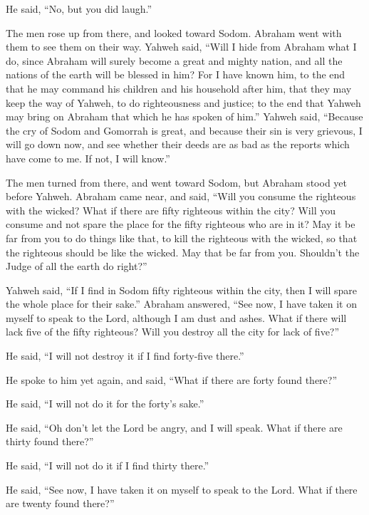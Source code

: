 He said, ``No, but you did laugh.''

 The men rose up from there, and looked toward Sodom.
Abraham went with them to see them on their way.  Yahweh
said, ``Will I hide from Abraham what I do,  since
Abraham will surely become a great and mighty nation, and all the
nations of the earth will be blessed in him?  For I have
known him, to the end that he may command his children and his household
after him, that they may keep the way of Yahweh, to do righteousness and
justice; to the end that Yahweh may bring on Abraham that which he has
spoken of him.''  Yahweh said, ``Because the cry of Sodom
and Gomorrah is great, and because their sin is very grievous,
 I will go down now, and see whether their deeds are as
bad as the reports which have come to me. If not, I will know.''

 The men turned from there, and went toward Sodom, but
Abraham stood yet before Yahweh.  Abraham came near, and
said, ``Will you consume the righteous with the wicked? 
What if there are fifty righteous within the city? Will you consume and
not spare the place for the fifty righteous who are in it?
 May it be far from you to do things like that, to kill
the righteous with the wicked, so that the righteous should be like the
wicked. May that be far from you. Shouldn't the Judge of all the earth
do right?''

 Yahweh said, ``If I find in Sodom fifty righteous within
the city, then I will spare the whole place for their sake.''
 Abraham answered, ``See now, I have taken it on myself
to speak to the Lord, although I am dust and ashes.  What
if there will lack five of the fifty righteous? Will you destroy all the
city for lack of five?''

He said, ``I will not destroy it if I find forty-five there.''

 He spoke to him yet again, and said, ``What if there are
forty found there?''

He said, ``I will not do it for the forty's sake.''

 He said, ``Oh don't let the Lord be angry, and I will
speak. What if there are thirty found there?''

He said, ``I will not do it if I find thirty there.''

 He said, ``See now, I have taken it on myself to speak
to the Lord. What if there are twenty found there?''

